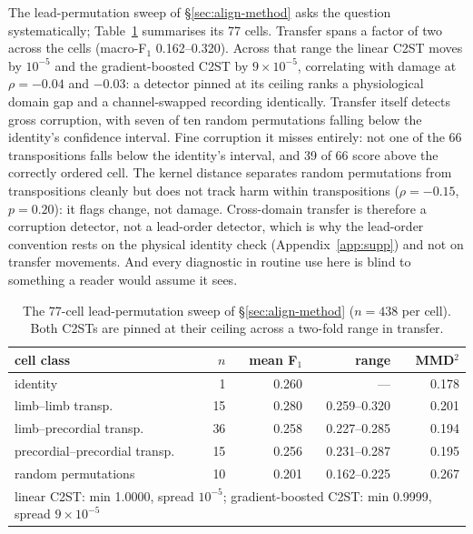 The lead-permutation sweep of \S\ref{sec:align-method} asks the question systematically; Table~\ref{tab:sweep} summarises its 77 cells. Transfer spans a factor of two across the cells (macro-F$_1$ 0.162--0.320). Across that range the linear C2ST moves by $10^{-5}$ and the gradient-boosted C2ST by $9\times10^{-5}$, correlating with damage at $\rho = -0.04$ and $-0.03$: a detector pinned at its ceiling ranks a physiological domain gap and a channel-swapped recording identically. Transfer itself detects gross corruption, with seven of ten random permutations falling below the identity's confidence interval. Fine corruption it misses entirely: not one of the 66 transpositions falls below the identity's interval, and 39 of 66 score above the correctly ordered cell. The kernel distance separates random permutations from transpositions cleanly but does not track harm within transpositions ($\rho=-0.15$, $p=0.20$): it flags change, not damage. Cross-domain transfer is therefore a corruption detector, not a lead-order detector, which is why the lead-order convention rests on the physical identity check (Appendix~\ref{app:supp}) and not on transfer movements. And every diagnostic in routine use here is blind to something a reader would assume it sees. 

\begin{table}[tb]
\centering\small
\caption{The 77-cell lead-permutation sweep of \S\ref{sec:align-method} ($n=438$ per cell). Both C2STs are pinned at their ceiling across a two-fold range in transfer.}
\label{tab:sweep}
\begin{tabular}{lrrrr}
\toprule
cell class & $n$ & mean F$_1$ & range & MMD$^2$ \\
\midrule
identity & 1 & 0.260 & --- & 0.178 \\
limb--limb transp. & 15 & 0.280 & 0.259--0.320 & 0.201 \\
limb--precordial transp. & 36 & 0.258 & 0.227--0.285 & 0.194 \\
precordial--precordial transp. & 15 & 0.256 & 0.231--0.287 & 0.195 \\
random permutations & 10 & 0.201 & 0.162--0.225 & 0.267 \\
\midrule
\multicolumn{5}{l}{linear C2ST: min 1.0000, spread $10^{-5}$; gradient-boosted C2ST: min 0.9999, spread $9\times10^{-5}$}\\
\bottomrule
\end{tabular}
\end{table}

